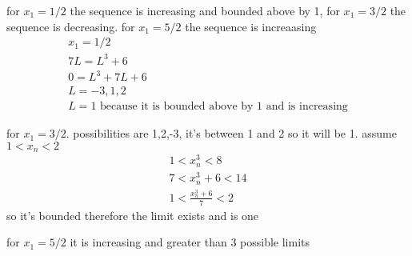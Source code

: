 \documentclass[letterpaper]{article}
\begin{document}
for $x_1=1/2$ the sequence is increasing and bounded above by 1, for $x_1=3/2$ the sequence is decreasing. for $x_1=5/2$ the sequence is increaasing
\begin{align*}
  x_1=1/2\\
  7L=L^3+6\\
  0=L^3+7L+6\\
  L=-3,1,2\\
  L=1\text{ because it is bounded above by 1 and is increasing}
\end{align*}

for $x_1=3/2$. possibilities are 1,2,-3, it's between 1 and 2 so it will be 1. assume $1<x_n<2$
\begin{align*}
  1<x_n^3<8\\
  7<x_n^3+6<14\\
  1<\frac{x_n^3+6}{7}<2
\end{align*}
so it's bounded therefore the limit exists and is one

for $x_1=5/2$ it is increasing and greater than 3 possible limits
\end{document}
